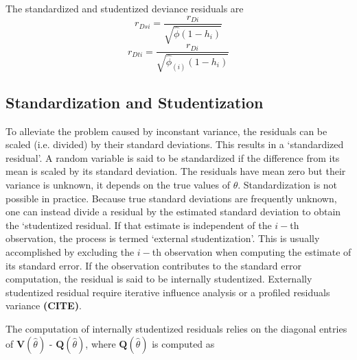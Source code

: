 \documentclass[12pt, a4paper]{report}
\theoremstyle{plain}
\theoremstyle{definition}
\theoremstyle{remark}
\begin{document}
	
	The standardized and studentized deviance residuals are
	\[
	r_{Dsi} = \frac{r_{Di}}{\sqrt{\hat{ \phi} (1- h_{i})} }\]
	\[r_{Dti} = \frac{r_{Di}}{\sqrt{ \hat{ \phi}_{(i)}
			(1- h_{i})}}\]
	
	
	
	
	
	
		
	

	\subsection{Standardization and Studentization} %
	To alleviate the problem caused by inconstant variance, the residuals can be scaled (i.e. divided) by their standard deviations. This results in a `standardized residual'. A random variable is said to be standardized if the difference from its mean is scaled by its standard deviation. The residuals  have mean zero but their variance is unknown, it depends on the true values of $\theta$. Standardization is  not possible in practice. Because true standard deviations are frequently unknown, one can instead divide a residual by the estimated standard deviation to obtain the `studentized residual. 
	If that estimate is independent of the $i-$th observation, the process is termed `external studentization'. This is usually accomplished by excluding the $i-$th observation when computing the estimate of its standard error. If the observation contributes to the
	standard error computation, the residual is said to be internally studentized.
	Externally  studentized residual require iterative influence analysis or a profiled residuals variance \textbf{(CITE)}.
	
	
	
	The computation of internally studentized residuals relies on the diagonal entries of $\boldsymbol{V} (\hat{\theta})$ - $\boldsymbol{Q} (\hat{\theta})$, where $\boldsymbol{Q} (\hat{\theta})$ is computed as
	
\end{document}
